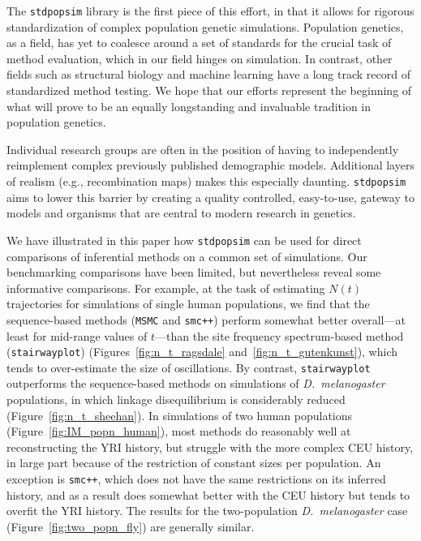 \documentclass[12pt,halfline,a4paper]{ouparticle}
\newcommand{\stdpopsim}{\texttt{stdpopsim}\xspace}
\newcommand{\MSMC}{\texttt{MSMC}\xspace}
\newcommand{\smcpp}{\texttt{smc++}\xspace}
\newcommand{\stairwayplot}{\texttt{stairwayplot}\xspace}
\begin{document}
The \stdpopsim library is the first piece of this effort, in that it allows for rigorous
standardization of complex population genetic simulations. Population genetics, as a field,
has yet to coalesce around a set of standards for the crucial task of method
evaluation, which in our field hinges on simulation. In contrast, other fields such as
structural biology \citep{moult1995large} and machine learning \citep{russakovsky2015imagenet} have a long track record
of standardized method testing. We hope that our efforts represent the beginning of what
will prove to be an equally longstanding and invaluable tradition in population genetics.

Individual research groups are often in the position of having to independently
reimplement complex previously published demographic models.
Additional layers of realism (e.g., recombination maps) makes this especially daunting.
\stdpopsim aims to lower this barrier
by creating a quality controlled, easy-to-use, gateway to models and organisms
that are central to modern research in genetics.

We have illustrated in this paper how \stdpopsim can be used for direct
comparisons of inferential methods on a common set of simulations. Our
benchmarking comparisons have been limited, but nevertheless
reveal some informative comparisons. For
example, at the task of estimating $N(t)$ trajectories for simulations of single human
populations, we find that the sequence-based methods (\MSMC and \smcpp)
perform somewhat better overall---at least for mid-range values of
$t$---than the site frequency spectrum-based method (\stairwayplot)
(Figures~\ref{fig:n_t_ragsdale} and~\ref{fig:n_t_gutenkunst}), which
tends to over-estimate the size of oscillations.  By contrast,
\stairwayplot outperforms the sequence-based methods
on simulations of \textit{D.~melanogaster} populations,
in which linkage disequilibrium is considerably reduced (Figure~\ref{fig:n_t_sheehan}).
In simulations of two human populations
(Figure~\ref{fig:IM_popn_human}), most methods do reasonably well at
reconstructing the YRI history, but struggle with the more complex CEU
history, in large part because of the restriction of constant sizes per
population.  An exception is \smcpp, which does not have the same
restrictions on its inferred history, and as a result does somewhat better
with the CEU history but tends to overfit the YRI history.  The results for
the two-population \textit{D.~melanogaster} case (Figure~\ref{fig:two_popn_fly})
are generally similar.  
\end{document}
